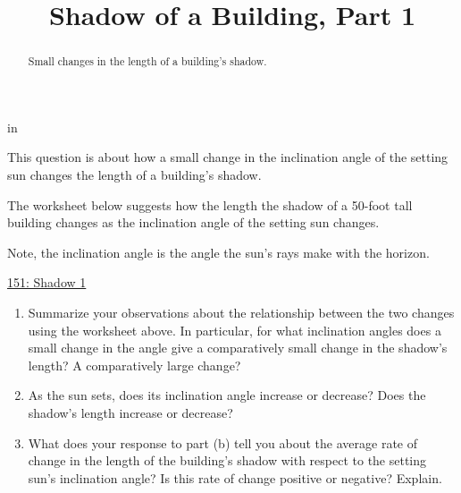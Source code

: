 \documentclass{ximera}
\title{Shadow of a Building, Part 1}
\newcommand{\pskip}{\vskip 0.1 in}
\begin{document}
\begin{abstract}
Small changes in the length of a building's shadow.
\end{abstract}
\maketitle


\pskip



\begin{question}  \label{QKdf3Dfer33}
This question is about how a small change in the inclination angle of the setting sun changes the length of a building's shadow.

The worksheet below suggests how the length the shadow of a 50-foot tall building changes as the inclination angle of the setting sun changes.

Note, the inclination angle is the angle the sun's rays make with the horizon.

\begin{onlineOnly}
    \begin{center}
\end{center}
\end{onlineOnly}

\href{https://www.desmos.com/calculator/vsnchdglo0}{151: Shadow 1}

\begin{enumerate}

\item Summarize your observations about the relationship between the two changes using the worksheet above. In particular, for what inclination angles does a small change in the angle give a comparatively small change in the shadow's length? A comparatively large change?

\begin{freeResponse}
\end{freeResponse}

\item As the sun sets, does its inclination angle increase or decrease? Does the shadow's length increase or decrease?
\begin{freeResponse}
\end{freeResponse}

\item What does your response to part (b) tell you about the average rate of change in the length of the building's shadow with respect to the setting sun's inclination angle? Is this rate of change positive or negative? Explain. 
\begin{freeResponse}
\end{freeResponse}


\end{enumerate}
\end{question}
\end{document}
